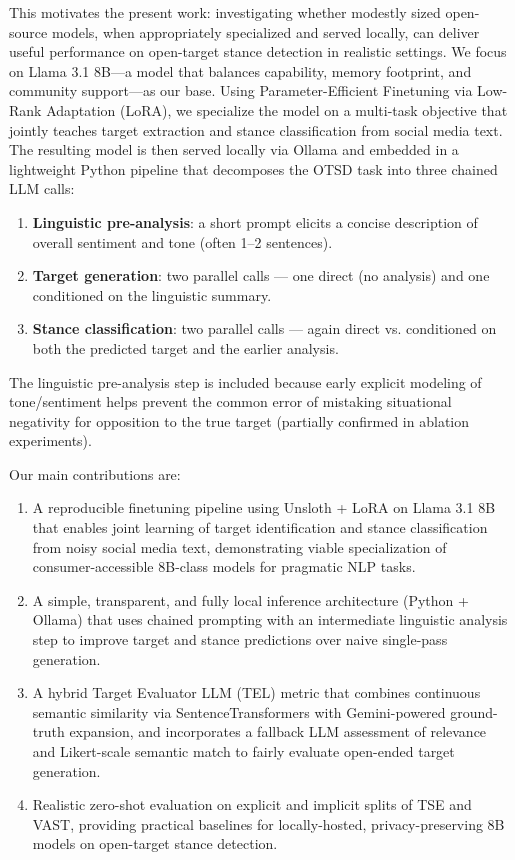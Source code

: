 \documentclass[conference]{IEEEtran}
\begin{document}
This motivates the present work: investigating whether modestly sized open-source models, when appropriately specialized and served locally, can deliver useful performance on open-target stance detection in realistic settings. We focus on Llama 3.1 8B—a model that balances capability, memory footprint, and community support—as our base. Using Parameter-Efficient Finetuning via Low-Rank Adaptation (LoRA), we specialize the model on a multi-task objective that jointly teaches target extraction and stance classification from social media text. The resulting model is then served locally via Ollama and embedded in a lightweight Python pipeline that decomposes the OTSD task into three chained LLM calls:

\begin{enumerate}
    \item \textbf{Linguistic pre-analysis}: a short prompt elicits a concise description of overall sentiment and tone (often 1–2 sentences).
    \item \textbf{Target generation}: two parallel calls — one direct (no analysis) and one conditioned on the linguistic summary.
    \item \textbf{Stance classification}: two parallel calls — again direct vs. conditioned on both the predicted target and the earlier analysis.
\end{enumerate}

The linguistic pre-analysis step is included because early explicit modeling of tone/sentiment helps prevent the common error of mistaking situational negativity for opposition to the true target (partially confirmed in ablation experiments).

Our main contributions are:

\begin{enumerate}
    \item A reproducible finetuning pipeline using Unsloth + LoRA on Llama 3.1 8B that enables joint learning of target identification and stance classification from noisy social media text, demonstrating viable specialization of consumer-accessible 8B-class models for pragmatic NLP tasks.
    \item A simple, transparent, and fully local inference architecture (Python + Ollama) that uses chained prompting with an intermediate linguistic analysis step to improve target and stance predictions over naive single-pass generation.
    \item A hybrid Target Evaluator LLM (TEL) metric that combines continuous semantic similarity via SentenceTransformers with Gemini-powered ground-truth expansion, and incorporates a fallback LLM assessment of relevance and Likert-scale semantic match to fairly evaluate open-ended target generation.
    \item Realistic zero-shot evaluation on explicit and implicit splits of TSE and VAST, providing practical baselines for locally-hosted, privacy-preserving 8B models on open-target stance detection.
\end{enumerate}
\end{document}
